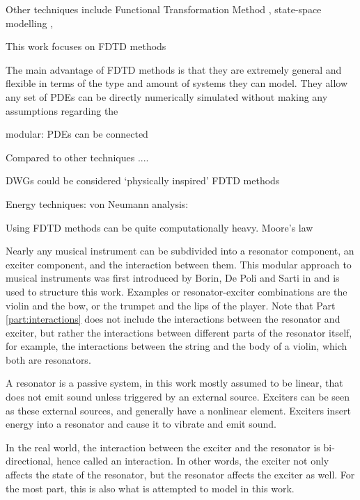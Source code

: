 Other techniques include Functional Transformation Method \cite{Trautmann2003}, state-space modelling \cite{Matignon1992}, 


This work focuses on FDTD methods 


The main advantage of FDTD methods is that they are extremely general and flexible in terms of the type and amount of systems they can model. They allow any set of PDEs can be directly numerically simulated without making any assumptions regarding the 

modular: PDEs can be connected

Compared to other techniques ....

DWGs could be considered `physically inspired' FDTD methods 

Energy techniques: \cite{Gustafsson2013}
von Neumann analysis: \cite{Strikwerda1989}

Using FDTD methods can be quite computationally heavy. 
Moore's law \cite{Moore1965}

Nearly any musical instrument can be subdivided into a resonator component, an exciter component, and the interaction between them. This modular approach to musical instruments was first introduced by Borin, De Poli and Sarti in \cite{Borin1989} and is used to structure this work. Examples or resonator-exciter combinations are the violin and the bow, or the trumpet and the lips of the player. Note that Part \ref{part:interactions} does not include the interactions between the resonator and exciter, but rather the interactions between different parts of the resonator itself, for example, the interactions between the string and the body of a violin, which both are resonators.  

A resonator is a passive system, in this work mostly assumed to be linear, that does not emit sound unless triggered by an external source. Exciters can be seen as these external sources, and generally have a nonlinear element. Exciters insert energy into a resonator and cause it to vibrate and emit sound.

In the real world, the interaction between the exciter and the resonator is bi-directional, hence called an interaction. In other words, the exciter not only affects the state of the resonator, but the resonator affects the exciter as well. For the most part, this is also what is attempted to model in this work.

